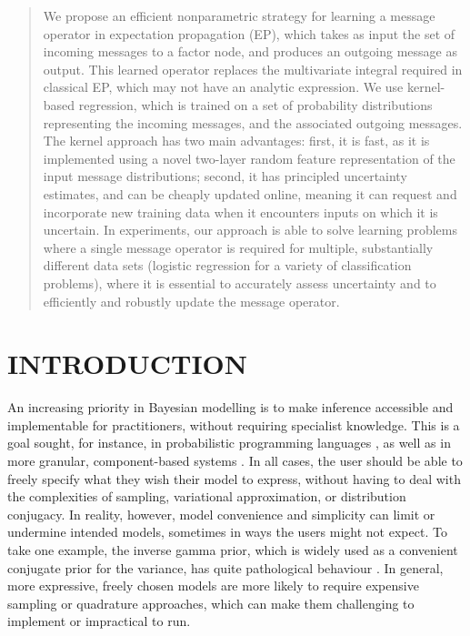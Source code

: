 \documentclass[english]{article}
\theoremstyle{plain}
\theoremstyle{plain}
\begin{document}
\begin{abstract}

  We propose an efficient nonparametric strategy for learning a message operator in expectation propagation (EP), which takes as input the set of incoming messages to a factor node, and produces an outgoing message as output. This learned operator replaces the multivariate integral required in classical EP, which may not have an analytic expression. We use kernel-based regression, which is trained on a set of probability distributions representing the incoming messages, and the associated outgoing messages. The kernel approach has two main advantages: first, it is fast, as it is implemented using a novel two-layer random feature representation of the input message distributions; second, it has principled uncertainty estimates, and can be cheaply updated online, meaning it can request and incorporate new training data when it encounters inputs on which it is uncertain.  In experiments, our approach is able to solve learning problems where a single message operator is required for multiple, substantially different data sets (logistic regression for a variety of classification problems), where
it is essential to
   accurately assess uncertainty and to efficiently and robustly update the message operator.

\end{abstract}

\section{INTRODUCTION}




An increasing priority in Bayesian modelling is to make inference accessible and implementable for practitioners,
without  requiring specialist knowledge.
This
is a goal sought, for instance, in probabilistic programming languages
\citep{WinGooStuSis11,GooManRoyBonTen08}, 
as well as in more granular, component-based
systems \citep{SDT2014,Minka2014}. In all cases, the user
should be able to freely specify what they wish their model to express,
without having to deal with the complexities of sampling, variational
approximation, or distribution conjugacy.  In reality, however, model convenience and
simplicity can  limit
or undermine intended models, sometimes in ways the users
might not expect. To take one example, the inverse gamma prior, which is
widely used as a convenient
conjugate prior for the variance, has quite pathological behaviour \citep{Gelman2006}.
In general, more expressive, freely chosen models are more likely
to require expensive sampling or quadrature approaches, which can make
them challenging to implement or impractical to run.
\end{document}

